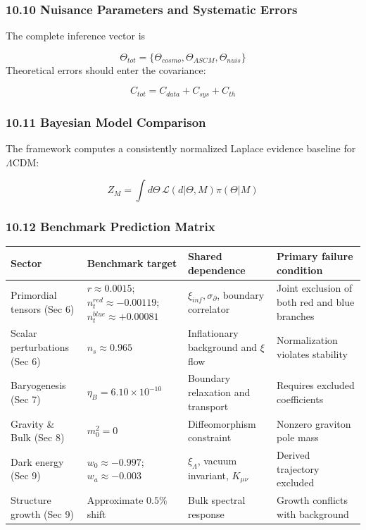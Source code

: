 \documentclass[aps,prd,onecolumn,superscriptaddress,nofootinbib,longbibliography,10pt]{revtex4-2}
\begin{document}
  
\subsubsection*{10.10 Nuisance Parameters and Systematic Errors}

  The complete inference vector is


  \[ \Theta_{tot} = \{\Theta_{cosmo}, \Theta_{ASCM}, \Theta_{nuis}\} \]
  Theoretical errors should enter the covariance:


  \[ C_{tot} = C_{data} + C_{sys} + C_{th} \]

  
\subsubsection*{10.11 Bayesian Model Comparison}

  The framework computes a consistently normalized Laplace evidence baseline for $\Lambda$CDM:


  \[ Z_M = \int d\Theta\,\mathcal{L}(d|\Theta, M)\pi(\Theta|M) \]

  
\subsubsection*{10.12 Benchmark Prediction Matrix}

  
\begin{center}
\begin{tabular}{|llll|}
\hline


Sector & Benchmark target & Shared dependence & Primary failure condition \\ \hline



Primordial tensors (Sec 6) & \(r \approx 0.0015\); \(n_t^{red} \approx -0.00119\); \(n_t^{blue} \approx +0.00081\) & \(\xi_{inf}, \sigma_\partial\), boundary correlator & Joint exclusion of both red and blue branches \\ \hline

Scalar perturbations (Sec 6) & \(n_s \approx 0.965\) & Inflationary background and \(\xi\) flow & Normalization violates stability \\ \hline

Baryogenesis (Sec 7) & \(\eta_B = 6.10 \times 10^{-10}\) & Boundary relaxation and transport & Requires excluded coefficients \\ \hline

Gravity \& Bulk (Sec 8) & \(m_0^2 = 0\) & Diffeomorphism constraint & Nonzero graviton pole mass \\ \hline

Dark energy (Sec 9) & \(w_0 \approx -0.997\); \(w_a \approx -0.003\) & \(\xi_\Lambda\), vacuum invariant, \(K_{\mu\nu}\) & Derived trajectory excluded \\ \hline

Structure growth (Sec 9) & Approximate \(0.5\%\) shift & Bulk spectral response & Growth conflicts with background \\ \hline


\end{tabular}
\end{center}
\end{document}
